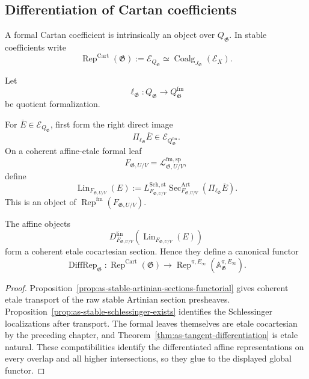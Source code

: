 \subsection{Differentiation of Cartan coefficients}

A formal Cartan coefficient is intrinsically an object over
$Q_{\mathfrak G}$.  In stable coefficients write
\[
\boxed{
    \operatorname{Rep}^{\mathrm{Cart}}(\mathfrak G)
    :=
    \mathcal E_{Q_{\mathfrak G}}
    \simeq
    \operatorname{Coalg}_{J_{\mathfrak G}}(\mathcal E_X).
}
\]

Let
\[
    \ell_{\mathfrak G}:
    Q_{\mathfrak G}\longrightarrow Q_{\mathfrak G}^{\mathrm{fm}}
\]
be quotient formalization.

\begin{construction}
\label{con:as-artdef-cartan-coefficient}
For
$\overline E\in\mathcal E_{Q_{\mathfrak G}}$, first form the right direct
image
\[
    \Pi_{\ell_{\mathfrak G}}\overline E
    \in
    \mathcal E_{Q_{\mathfrak G}^{\mathrm{fm}}}.
\]
On a coherent affine-etale formal leaf
\[
    F_{\mathfrak G,U/V}
    =
    \mathcal L_{\mathfrak G,U/V}^{\mathrm{fm,sp}},
\]
define
\[
\boxed{
    \operatorname{Lin}_{F_{\mathfrak G,U/V}}(E)
    :=
    L_{F_{\mathfrak G,U/V}}^{\mathrm{Sch,st}}
    \operatorname{Sec}^{\mathrm{Art}}_{F_{\mathfrak G,U/V}}
    \left(
        \Pi_{\ell_{\mathfrak G}}\overline E
    \right).
}
\]
This is an object of
$\operatorname{Rep}^{\mathrm{fm}}(F_{\mathfrak G,U/V})$.
\end{construction}

\begin{theorem}
\label{thm:as-cart-rep-differentiation}
The affine objects
\[
    D^{\mathrm{lin}}_{F_{\mathfrak G,U/V}}
    \left(
        \operatorname{Lin}_{F_{\mathfrak G,U/V}}(E)
    \right)
\]
form a coherent etale cocartesian section.  Hence they define a canonical
functor
\[
\boxed{
    \operatorname{DiffRep}_{\mathfrak G}:
    \operatorname{Rep}^{\mathrm{Cart}}(\mathfrak G)
    \longrightarrow
    \operatorname{Rep}^{\pi,E_\infty}
    \left(
        \mathbb A^{\pi,E_\infty}_{\mathfrak G}
    \right).
}
\]
\end{theorem}

\begin{proof}
Proposition~\ref{prop:as-stable-artinian-sections-functorial} gives coherent
etale transport of the raw stable Artinian section presheaves.
Proposition~\ref{prop:as-stable-schlessinger-exists} identifies the
Schlessinger localizations after transport.  The formal leaves themselves
are etale cocartesian by the preceding chapter, and
Theorem~\ref{thm:as-tangent-differentiation} is etale natural.  These
compatibilities identify the differentiated affine representations on every
overlap and all higher intersections, so they glue to the displayed global
functor.
\end{proof}

